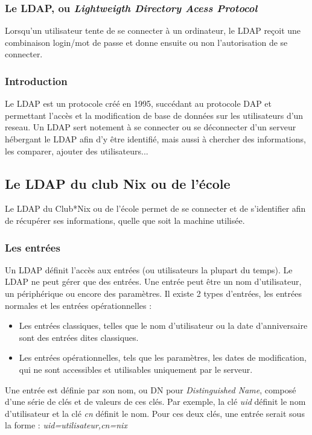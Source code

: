 \subsubsection{Le LDAP, ou \textit{Lightweigth Directory Acess Protocol}}

Lorsqu'un utilisateur tente de se connecter à un ordinateur, le LDAP reçoit une combinaison login/mot de passe et donne
ensuite ou non l'autorisation de se connecter.


\subsubsection{Introduction}

Le LDAP est un protocole créé en 1995, succédant au protocole DAP et permettant l'accès et la modification de base de données
 sur les utilisateurs d'un reseau. Un LDAP sert notement à se connecter ou se déconnecter d'un serveur hébergant le LDAP afin
  d'y être identifié, mais aussi à chercher des informations, les comparer, ajouter des utilisateurs...
\subsection{Le LDAP du club Nix ou de l'école}
Le LDAP du Club*Nix ou de l'école permet de se connecter et de s'identifier afin de récupérer ses informations, quelle que soit
 la machine utilisée.


\subsubsection{Les entrées}

Un LDAP définit l'accès aux entrées (ou utilisateurs la plupart du temps).
Le LDAP ne peut gérer que des entrées. Une entrée peut être un nom d'utilisateur, un périphérique ou encore des paramètres.
 Il existe 2 types d'entrées, les entrées normales et les entrées opérationnelles :
\begin{itemize}
    \item Les entrées classiques, telles que le nom d'utilisateur ou la date d'anniversaire sont des entrées dites classiques.
    \item Les entrées opérationnelles, tels que les paramètres, les dates de modification, qui ne sont accessibles et utilisables
    uniquement par le serveur.
\end{itemize}
Une entrée est définie par son nom, ou DN pour \textit{Distinguished Name}, composé d'une série de clés et de valeurs de ces clés.
Par exemple, la clé \textit{uid} définit le nom d'utilisateur et la clé \textit{cn} définit le nom. Pour ces deux clés,
 une entrée serait sous la forme : \textit{uid=utilisateur,cn=nix}


